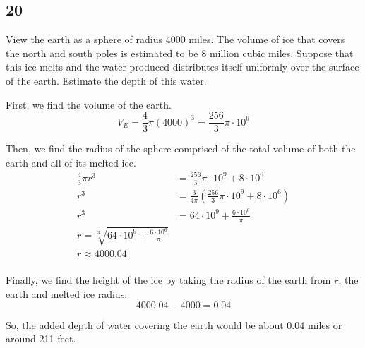 \documentclass[../hw4.tex]{subfiles}
\begin{document}
\subsection*{20}
View the earth as a sphere of radius 4000 miles. The volume
of ice that covers the north and south poles is estimated to
be 8 million cubic miles. Suppose that this ice melts and the
water produced distributes itself uniformly over the surface
of the earth. Estimate the depth of this water.

First, we find the volume of the earth.
\[V_E = \frac{4}{3}\pi{(4000)}^3=\frac{256}{3}\pi\cdot10^9\]

Then, we find the radius of the sphere comprised of the total volume of both the earth and all of its melted ice. 
\begin{align*}
    \frac{4}{3}\pi r^3 &= \frac{256}{3}\pi\cdot10^9 + 8\cdot10^6 \\
    r^3 &= \frac{3}{4\pi} \left( \frac{256}{3}\pi\cdot10^9 + 8\cdot10^6 \right) \\
    r^3 &= 64\cdot10^9 + \frac{6\cdot10^6}{\pi} \\
    r = \sqrt[3]{64\cdot10^9 + \frac{6\cdot10^6}{\pi}} \\
    r \approx 4000.04 \\
\end{align*}

Finally, we find the height of the ice by taking the radius of the earth from $r$, the earth and melted ice radius. 
\[4000.04-4000 = 0.04\]

So, the added depth of water covering the earth would be about 0.04 miles or around 211 feet.
\end{document}
